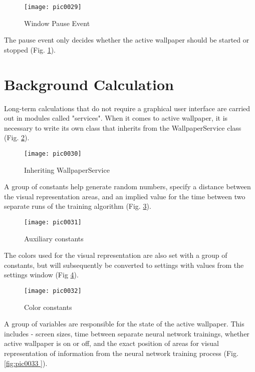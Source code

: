 \begin{figure}[h]
\centering
\texttt{[image: pic0029]}
\caption{Window Pause Event}
\label{fig:pic0029}
\end{figure}
\FloatBarrier

The pause event only decides whether the active wallpaper should be started or stopped (Fig. \ref{fig:pic0029}).

\section{Background Calculation}

Long-term calculations that do not require a graphical user interface are carried out in modules called "services". When it comes to active wallpaper, it is necessary to write its own class that inherits from the WallpaperService class (Fig. \ref{fig:pic0030}).

\begin{figure}[h]
\centering
\texttt{[image: pic0030]}
\caption{Inheriting WallpaperService}
\label{fig:pic0030}
\end{figure}
\FloatBarrier

A group of constants help generate random numbers, specify a distance between the visual representation areas, and an implied value for the time between two separate runs of the training algorithm (Fig. \ref{fig:pic0031}).

\begin{figure}[h]
\centering
\texttt{[image: pic0031]}
\caption{Auxiliary constants}
\label{fig:pic0031}
\end{figure}
\FloatBarrier

The colors used for the visual representation are also set with a group of constants, but will subsequently be converted to settings with values from the settings window (Fig \ref{fig:pic0032}).

\begin{figure}[h]
\centering
\texttt{[image: pic0032]}
\caption{Color constants}
\label{fig:pic0032}
\end{figure}
\FloatBarrier

A group of variables are responsible for the state of the active wallpaper. This includes - screen sizes, time between separate neural network trainings, whether active wallpaper is on or off, and the exact position of areas for visual representation of information from the neural network training process (Fig. \ref{fig:pic0033 }).

